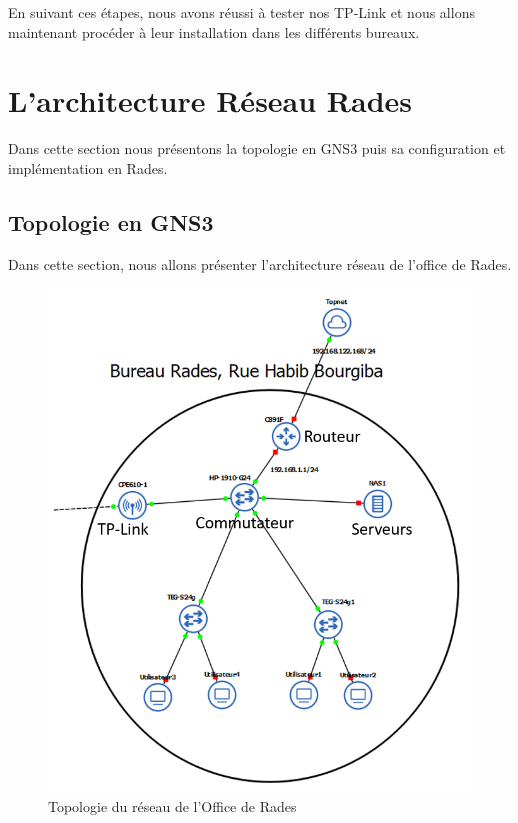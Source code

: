 En suivant ces étapes, nous avons réussi à tester nos TP-Link et nous allons maintenant procéder à leur installation dans les différents bureaux. \\

\section{L'architecture Réseau Rades}

Dans cette section nous présentons la topologie en GNS3 puis sa configuration et implémentation en Rades.

\subsection{Topologie en GNS3}

Dans cette section, nous allons présenter l'architecture réseau de l'office de Rades. \\

\begin{figure}[H]
 \centering
    \includegraphics[width=16cm]{Images/BRades-Topologie.png}
    \caption{Topologie du réseau de l'Office de Rades}
    \label{Chap2.2.0}
\end{figure}




